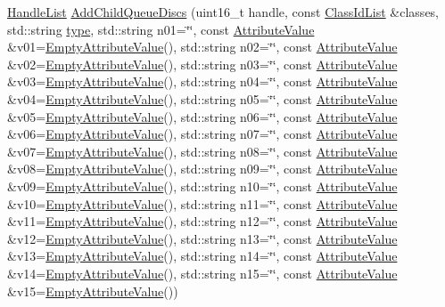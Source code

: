 \begin{DoxyCompactItemize}
\item 
\hyperlink{classns3_1_1TrafficControlHelper_a0077f89ad2e6f94f6f108eca4f3a8534}{Handle\+List} \hyperlink{classns3_1_1TrafficControlHelper_ac50060cd07f2aa3b77d43808c775456b}{Add\+Child\+Queue\+Discs} (uint16\+\_\+t handle, const \hyperlink{classns3_1_1TrafficControlHelper_aa42018a8e7faa9b7d1d4d2320014ef56}{Class\+Id\+List} \&classes, std\+::string \hyperlink{visualizer-ideas_8txt_add98db9e15e2a58cf2b57623e7aa893a}{type}, std\+::string n01=\char`\"{}\char`\"{}, const \hyperlink{classns3_1_1AttributeValue}{Attribute\+Value} \&v01=\hyperlink{classns3_1_1EmptyAttributeValue}{Empty\+Attribute\+Value}(), std\+::string n02=\char`\"{}\char`\"{}, const \hyperlink{classns3_1_1AttributeValue}{Attribute\+Value} \&v02=\hyperlink{classns3_1_1EmptyAttributeValue}{Empty\+Attribute\+Value}(), std\+::string n03=\char`\"{}\char`\"{}, const \hyperlink{classns3_1_1AttributeValue}{Attribute\+Value} \&v03=\hyperlink{classns3_1_1EmptyAttributeValue}{Empty\+Attribute\+Value}(), std\+::string n04=\char`\"{}\char`\"{}, const \hyperlink{classns3_1_1AttributeValue}{Attribute\+Value} \&v04=\hyperlink{classns3_1_1EmptyAttributeValue}{Empty\+Attribute\+Value}(), std\+::string n05=\char`\"{}\char`\"{}, const \hyperlink{classns3_1_1AttributeValue}{Attribute\+Value} \&v05=\hyperlink{classns3_1_1EmptyAttributeValue}{Empty\+Attribute\+Value}(), std\+::string n06=\char`\"{}\char`\"{}, const \hyperlink{classns3_1_1AttributeValue}{Attribute\+Value} \&v06=\hyperlink{classns3_1_1EmptyAttributeValue}{Empty\+Attribute\+Value}(), std\+::string n07=\char`\"{}\char`\"{}, const \hyperlink{classns3_1_1AttributeValue}{Attribute\+Value} \&v07=\hyperlink{classns3_1_1EmptyAttributeValue}{Empty\+Attribute\+Value}(), std\+::string n08=\char`\"{}\char`\"{}, const \hyperlink{classns3_1_1AttributeValue}{Attribute\+Value} \&v08=\hyperlink{classns3_1_1EmptyAttributeValue}{Empty\+Attribute\+Value}(), std\+::string n09=\char`\"{}\char`\"{}, const \hyperlink{classns3_1_1AttributeValue}{Attribute\+Value} \&v09=\hyperlink{classns3_1_1EmptyAttributeValue}{Empty\+Attribute\+Value}(), std\+::string n10=\char`\"{}\char`\"{}, const \hyperlink{classns3_1_1AttributeValue}{Attribute\+Value} \&v10=\hyperlink{classns3_1_1EmptyAttributeValue}{Empty\+Attribute\+Value}(), std\+::string n11=\char`\"{}\char`\"{}, const \hyperlink{classns3_1_1AttributeValue}{Attribute\+Value} \&v11=\hyperlink{classns3_1_1EmptyAttributeValue}{Empty\+Attribute\+Value}(), std\+::string n12=\char`\"{}\char`\"{}, const \hyperlink{classns3_1_1AttributeValue}{Attribute\+Value} \&v12=\hyperlink{classns3_1_1EmptyAttributeValue}{Empty\+Attribute\+Value}(), std\+::string n13=\char`\"{}\char`\"{}, const \hyperlink{classns3_1_1AttributeValue}{Attribute\+Value} \&v13=\hyperlink{classns3_1_1EmptyAttributeValue}{Empty\+Attribute\+Value}(), std\+::string n14=\char`\"{}\char`\"{}, const \hyperlink{classns3_1_1AttributeValue}{Attribute\+Value} \&v14=\hyperlink{classns3_1_1EmptyAttributeValue}{Empty\+Attribute\+Value}(), std\+::string n15=\char`\"{}\char`\"{}, const \hyperlink{classns3_1_1AttributeValue}{Attribute\+Value} \&v15=\hyperlink{classns3_1_1EmptyAttributeValue}{Empty\+Attribute\+Value}())

\end{DoxyCompactItemize}
